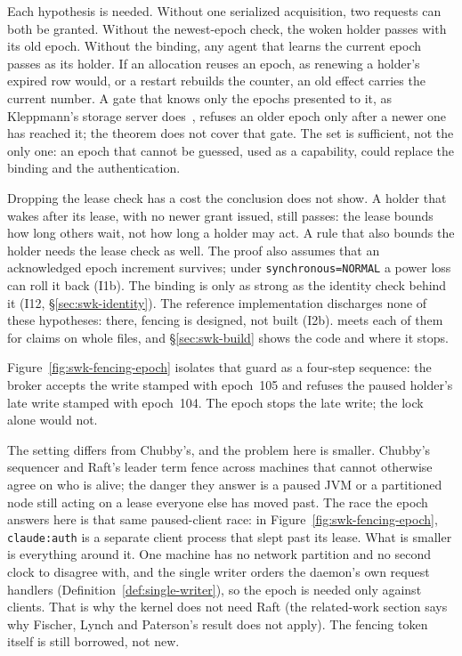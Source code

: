\documentclass[11pt,a4paper]{article}
\theoremstyle{definition}
\theoremstyle{remark}
\begin{document}
\begin{pdboundary}
\setlength{\parskip}{4pt plus 1pt}
Each hypothesis is needed. Without one serialized acquisition, two requests
can both be granted. Without the newest-epoch check, the woken holder passes
with its old epoch. Without the binding, any agent that learns the current
epoch passes as its holder. If an allocation reuses an epoch, as renewing a
holder's expired row would, or a restart rebuilds the counter, an old effect
carries the current number. A gate that
knows only the epochs presented to it, as Kleppmann's storage server
does~, refuses an older epoch only after a newer
one has reached it; the theorem does not cover that gate. The set is
sufficient, not the only one: an epoch that cannot be guessed, used as a
capability, could replace the binding and the authentication.

Dropping the lease check has a cost the conclusion does not show. A holder
that wakes after its lease, with no newer grant issued, still passes: the lease
bounds how long others wait, not how long a holder may act. A rule that also
bounds the holder needs the lease check as well. The proof also assumes that an
acknowledged epoch increment survives; under \texttt{synchronous=NORMAL} a power
loss can roll it back (I1b). The binding is only as strong as the identity
check behind it (I12, \S\ref{sec:swk-identity}). The reference implementation
discharges none of these hypotheses: there, fencing is designed, not built
(I2b). \pdkernelname{} meets each of them for claims on whole files, and
\S\ref{sec:swk-build} shows the code and where it stops.
\end{pdboundary}



Figure~\ref{fig:swk-fencing-epoch} isolates that guard as a four-step
sequence: the broker accepts the write stamped with epoch~105 and refuses the
paused holder's late write stamped with epoch~104. The epoch stops the late
write; the lock alone would not.

%

The setting differs from Chubby's, and the problem here is smaller.
Chubby's sequencer and Raft's leader term fence across machines that cannot
otherwise agree on who is alive; the danger they answer is a paused JVM or a
partitioned node still acting on a lease everyone else has moved past. The race
the epoch answers here is that same paused-client race: in
Figure~\ref{fig:swk-fencing-epoch}, \texttt{claude:auth} is a separate client
process that slept past its lease. What is smaller is everything around it. One
machine has no network partition and no second clock to disagree with, and the
single writer orders the daemon's own request handlers
(Definition~\ref{def:single-writer}), so the epoch is needed only against
clients. That is why the kernel
does not need Raft (the related-work section says why Fischer, Lynch and
Paterson's result does not apply). The fencing token itself is still borrowed, not new.
\end{document}
